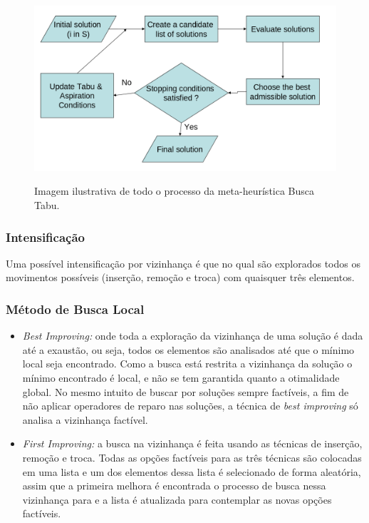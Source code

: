 \documentclass[conference]{IEEEtran}
\begin{document}
    \begin{figure}[!htb]
  \centering
 
  \includegraphics[scale=0.25]{imagens/busca-tabu.png}
  \label{figura_tabu}
 \caption{Imagem ilustrativa de todo o processo da meta-heurística Busca Tabu. \cite{fraser2013whole}}
\end{figure}

    \subsubsection{Intensificação}

        Uma possível intensificação por vizinhança é que no qual são explorados todos os movimentos possíveis (inserção, remoção e troca) com quaisquer três elementos. 

    \subsubsection{Método de Busca Local}

        \begin{itemize}

        \item {\it Best Improving:} onde toda a exploração da vizinhança de uma solução é dada até a exaustão, ou seja, todos os elementos são analisados até que o mínimo local seja encontrado. Como
            a busca está restrita a vizinhança da solução o mínimo encontrado é local, e não se tem garantida quanto a otimalidade global. No mesmo intuito de buscar por soluções sempre factíveis, a
                fim de não aplicar operadores de reparo nas soluções, a técnica de {\it best improving} só analisa a vizinhança factível. 

        \item {\it First Improving:} a busca na vizinhança é feita usando as técnicas de inserção, remoção e troca. Todas as opções factíveis para as três técnicas são colocadas em uma lista
        e um dos elementos dessa lista é selecionado de forma aleatória, assim que a primeira melhora é encontrada o processo de busca nessa vizinhança para e a lista é atualizada para
        contemplar as novas opções factíveis. 
        \end{itemize}
\end{document}
